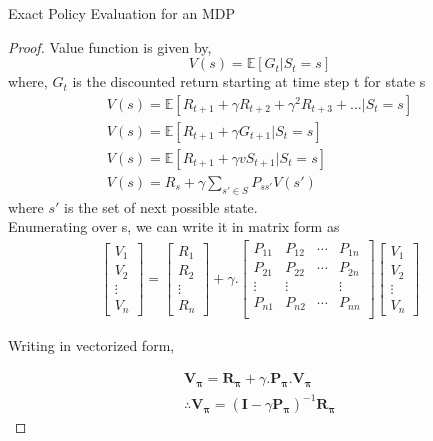 \documentclass[12pt]{article}
\newenvironment{problem}[2][\large Problem]{\begin{trivlist}
\item[\hskip \labelsep {\bfseries #1}\hskip \labelsep {\bfseries #2.}]}{\end{trivlist}}
\begin{document}
\begin{problem} {8} Exact Policy Evaluation for an MDP\\
\begin{proof}
	Value function is given by,
	\begin{equation}
	\nonumber
	V(s) = \mathbb{E}[G_t|S_t = s]
	\end{equation}
where, $G_t$ is the discounted return starting at time step t for state s
	\begin{align}
	\nonumber
	V(s) = \mathbb{E}[R_{t+1} + \gamma R_{t+2} + \gamma^2 R_{t+3} + ... |S_t = s] \\
	\nonumber
	V(s) = \mathbb{E}[R_{t+1} + \gamma G_{t+1}|S_t = s]\\
	\nonumber
	V(s) = \mathbb{E}[R_{t+1} + \gamma vS_{t+1}| S_t = s]\\
	\nonumber
	V(s) = R_s + \gamma \sum_{s'\in S}P_{ss'}V(s')
	\nonumber
	\end{align}
where $s'$ is the set of next possible state.\\
Enumerating over s, we can write it in matrix form as  
	\begin{align}
	\begin{bmatrix}
	V_{1} \\
	V_{2} \\
	\vdots \\
	V_{n}
	\end{bmatrix}
	=
	\begin{bmatrix}
	R_{1} \\
	R_{2} \\
	\vdots \\
	R_{n}
	\end{bmatrix}
	+ \gamma.
	\begin{bmatrix}
	P_{11} & P_{12} & \cdots & P_{1n}\\
	P_{21} & P_{22} & \cdots & P_{2n}\\
	\vdots & \vdots& & \vdots\\
	P_{n1} & P_{n2} & \cdots & P_{nn}\\
	\end{bmatrix}
	\begin{bmatrix}
	V_{1} \\
	V_{2} \\
	\vdots \\
	V_{n}
	\end{bmatrix} \nonumber
	\end{align}
	
	Writing in vectorized form, 
	
	\begin{align}
	\mathbf{V_{\pi}} = \mathbf{R_{\pi}} + \gamma.\mathbf{P_\pi}.\mathbf{V_{\pi}} \nonumber \\
	\therefore \mathbf{V_{\pi}} = (\mathbf{I} - \gamma \mathbf{P_{\pi}})^{-1}\mathbf{R_{\pi}} \nonumber
	\end{align}
\end{proof}
\end{problem}
\end{document}
